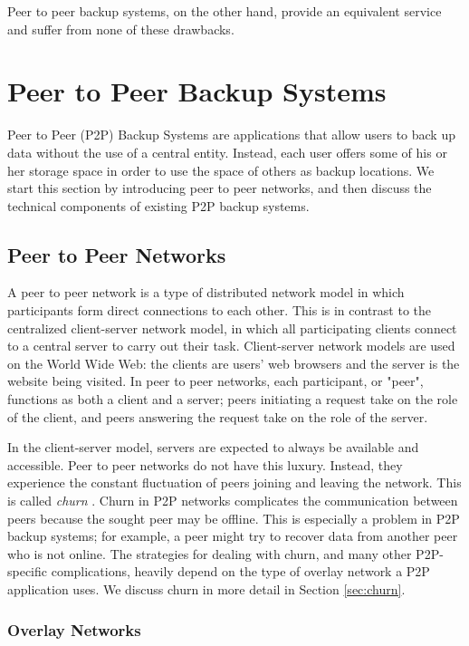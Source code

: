 \documentclass[12pt]{report}
\begin{document}
Peer to peer backup systems, on the other hand, provide an equivalent service and suffer from none of these drawbacks.

\section{Peer to Peer Backup Systems}

Peer to Peer (P2P) Backup Systems are applications that allow users to back up data without the use of a central entity. Instead, each user offers some of his or her storage space in order to use the space of others as backup locations. We start this section by introducing peer to peer networks, and then discuss the technical components of existing P2P backup systems.

\subsection{Peer to Peer Networks}

A peer to peer network is a type of distributed network model in which participants form direct connections to each other. This is in contrast to the centralized client-server network model, in which all participating clients connect to a central server to carry out their task. Client-server network models are used on the World Wide Web: the clients are users' web browsers and the server is the website being visited. In peer to peer networks, each participant, or "peer", functions as both a client and a server; peers initiating a request take on the role of the client, and peers answering the request take on the role of the server.

In the client-server model, servers are expected to always be available and accessible. Peer to peer networks do not have this luxury. Instead, they experience the constant fluctuation of peers joining and leaving the network. This is called \textit{churn} \cite{StorageSearchP2PNetworks}. Churn in P2P networks complicates the communication between peers because the sought peer may be offline. This is especially a problem in P2P backup systems; for example, a peer might try to recover data from another peer who is not online. The strategies for dealing with churn, and many other P2P-specific complications, heavily depend on the type of overlay network a P2P application uses. We discuss churn in more detail in Section \ref{sec:churn}.

\subsubsection{Overlay Networks}
\end{document}
